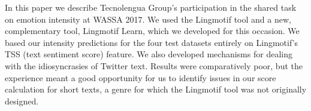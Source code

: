 In this paper we describe Tecnolengua Group's participation in the shared task on emotion intensity at WASSA 2017. We used the Lingmotif tool and a new, complementary tool, Lingmotif Learn, which we developed for this occasion. We based our intensity predictions for the four test datasets entirely on Lingmotif's TSS (text sentiment score) feature. We also developed mechanisms for dealing with the idiosyncrasies of Twitter text. Results were comparatively poor, but the experience meant a good opportunity for us to identify issues in our score calculation for short texts, a genre for which the Lingmotif tool was not originally designed.
